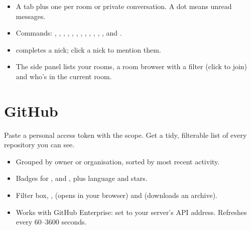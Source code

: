
\begin{itemize}
  \item A  tab plus one per room or private conversation. A dot means unread messages.
  \item Commands: , , , , , , ,
        , , , , ,  and .
  \item {} completes a nick; click a nick to mention them.
  \item The side panel lists your rooms, a room browser with a filter (click to join) and who's in the current room.
\end{itemize}


\chapter{GitHub}\label{ch:github}


\begin{tldr}
Paste a personal access token with the  scope. Get a tidy, filterable list of every repository you can see.
\end{tldr}


\begin{itemize}
  \item Grouped by owner or organisation, sorted by most recent activity.
  \item Badges for ,  and , plus language and stars.
  \item Filter box, ,  (opens in your browser) and  (downloads an archive).
  \item Works with GitHub Enterprise: set  to your server's API address. Refreshes every 60–3600 seconds.
\end{itemize}

